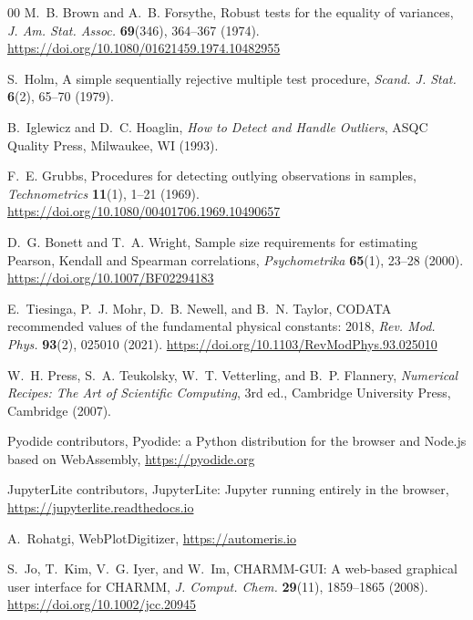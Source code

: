 \documentclass[11pt,a4paper]{article}
\begin{document}
{\begin{thebibliography}{00}
M.~B. Brown and A.~B. Forsythe,
\newblock Robust tests for the equality of variances,
\newblock \emph{J. Am. Stat. Assoc.} \textbf{69}(346), 364--367 (1974).
\newblock \url{https://doi.org/10.1080/01621459.1974.10482955}

S.~Holm,
\newblock A simple sequentially rejective multiple test procedure,
\newblock \emph{Scand. J. Stat.} \textbf{6}(2), 65--70 (1979).

B.~Iglewicz and D.~C. Hoaglin,
\newblock \emph{How to Detect and Handle Outliers},
\newblock ASQC Quality Press, Milwaukee, WI (1993).

F.~E. Grubbs,
\newblock Procedures for detecting outlying observations in samples,
\newblock \emph{Technometrics} \textbf{11}(1), 1--21 (1969).
\newblock \url{https://doi.org/10.1080/00401706.1969.10490657}

D.~G. Bonett and T.~A. Wright,
\newblock Sample size requirements for estimating Pearson, Kendall and
  Spearman correlations,
\newblock \emph{Psychometrika} \textbf{65}(1), 23--28 (2000).
\newblock \url{https://doi.org/10.1007/BF02294183}

E.~Tiesinga, P.~J. Mohr, D.~B. Newell, and B.~N. Taylor,
\newblock CODATA recommended values of the fundamental physical constants: 2018,
\newblock \emph{Rev. Mod. Phys.} \textbf{93}(2), 025010 (2021).
\newblock \url{https://doi.org/10.1103/RevModPhys.93.025010}

W.~H. Press, S.~A. Teukolsky, W.~T. Vetterling, and B.~P. Flannery,
\newblock \emph{Numerical Recipes: The Art of Scientific Computing},
\newblock 3rd ed., Cambridge University Press, Cambridge (2007).

Pyodide contributors,
\newblock Pyodide: a Python distribution for the browser and Node.js based on
  WebAssembly,
\newblock \url{https://pyodide.org}

JupyterLite contributors,
\newblock JupyterLite: Jupyter running entirely in the browser,
\newblock \url{https://jupyterlite.readthedocs.io}

A.~Rohatgi,
\newblock WebPlotDigitizer,
\newblock \url{https://automeris.io}

S.~Jo, T.~Kim, V.~G. Iyer, and W.~Im,
\newblock CHARMM-GUI: A web-based graphical user interface for CHARMM,
\newblock \emph{J. Comput. Chem.} \textbf{29}(11), 1859--1865 (2008).
\newblock \url{https://doi.org/10.1002/jcc.20945}


\end{thebibliography}}
\end{document}
